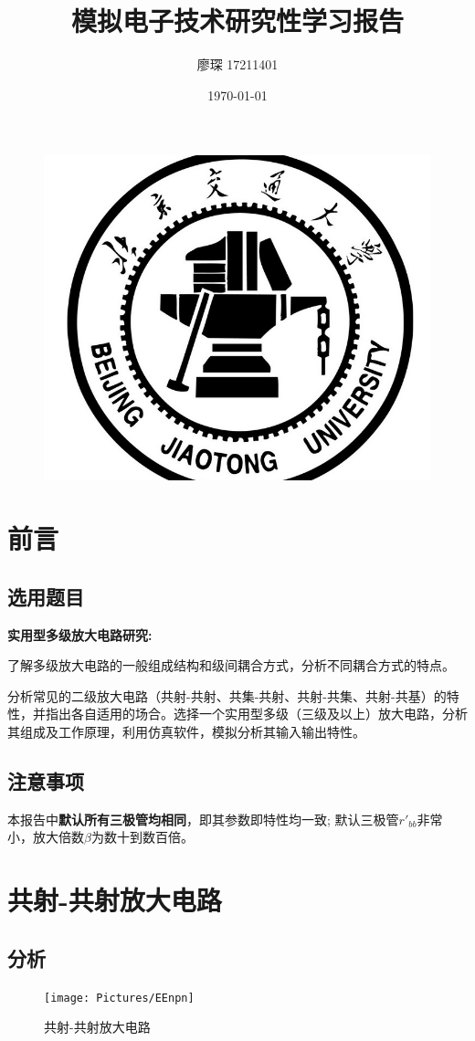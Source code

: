 \documentclass[11pt,a4paper,UTF8]{ctexart}
\title{模拟电子技术研究性学习报告}
\author{廖琛 17211401}
\date{\today}
\begin{document}
	\begin{figure}
	\centering
	\includegraphics[width=0.7\linewidth]{Pictures/BJTU_logo}
	\end{figure}

	
	\maketitle
	\newpage
	\tableofcontents
	\newpage
	\section{前言}
		\subsection{选用题目}
			\textbf{实用型多级放大电路研究:}
	
			了解多级放大电路的一般组成结构和级间耦合方式，分析不同耦合方式的特点。
	
			分析常见的二级放大电路（共射-共射、共集-共射、共射-共集、共射-共基）的特性，并指出各自适用的场合。选择一个实用型多级（三级及以上）放大电路，分析其组成及工作原理，利用仿真软件，模拟分析其输入输出特性。
		\subsection{注意事项}
			本报告中\textbf{默认所有三极管均相同}，即其参数即特性均一致; 默认三极管$r'_{bb}$非常小，放大倍数$\beta$为数十到数百倍。

	\section{共射-共射放大电路}
		\subsection{分析}
			\begin{figure}[H]
				\centering
				\texttt{[image: Pictures/EEnpn]}
				\caption{共射-共射放大电路}
				\label{fig:eenpn}
			\end{figure}
\end{document}
